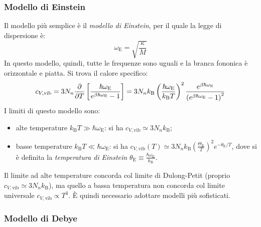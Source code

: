 \subsubsection{Modello di Einstein}

Il modello più semplice è il \textit{modello di Einstein}, per il quale la legge di dispersione è:
\begin{equation}
	\omega_\text{E} = \sqrt{\frac{\kappa}{M}}
\end{equation}
In questo modello, quindi, tutte le frequenze sono uguali e la branca fononica è orizzontale e piatta. Si trova il calore specifico:
\begin{equation*}
	c_{V,\text{vib}} = 3N_n \frac{\partial}{\partial T} \left[ \frac{\hbar \omega_\text{E}}{e^{\beta \hbar \omega_\text{E}} - 1} \right] = 3 N_n k_\text{B} \left( \frac{\hbar \omega_\text{E}}{k_\text{B} T} \right)^2 \frac{e^{\beta \hbar \omega_\text{E}}}{\left( e^{\beta \hbar \omega_\text{E}} - 1 \right)^2}
\end{equation*}
I limiti di questo modello sono:
\begin{itemize}
	\item alte temperature $ k_\text{B} T \gg \hbar \omega_\text{E} $: si ha $ c_{V,\text{vib}} \simeq 3 N_n k_\text{B} $;
	\item basse temperature $ k_\text{B} T \ll \hbar \omega_\text{E} $: si ha $ c_{V,\text{vib}}(T) \simeq 3 N_n k_\text{B} \left( \frac{\Theta_\text{E}}{T} \right)^2 e^{- \theta_\text{E} / T} $, dove si è definita la \textit{temperatura di Einstein} $ \theta_\text{E} \equiv \frac{\hbar \omega_\text{E}}{k_\text{B}} $.
\end{itemize}
Il limite ad alte temperature concorda col limite di Dulong-Petit (proprio $ c_{V,\text{vib}} \simeq 3 N_n k_\text{B} $), ma quello a bassa temperatura non concorda col limite universale $ c_{V,\text{vib}} \propto T^3 $. È quindi necessario adottare modelli più sofisticati.

\subsubsection{Modello di Debye}

